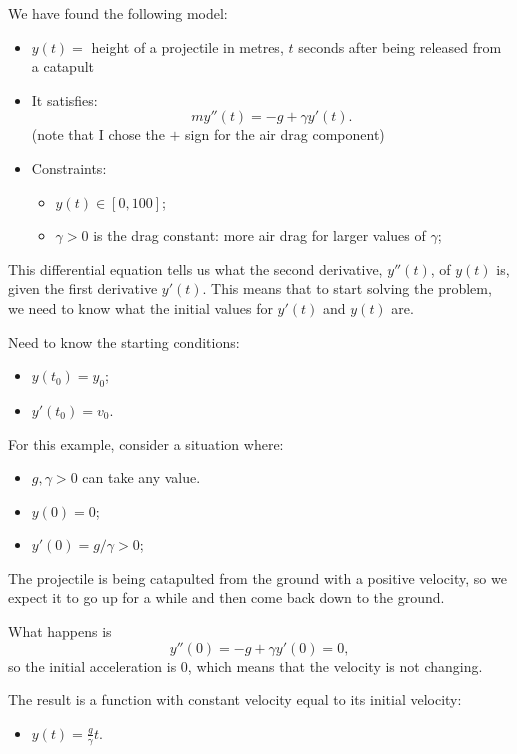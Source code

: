 \begin{example}
We have found the following model:
\begin{itemize}
	\item $y(t) = $ height of a projectile in metres, $t$ seconds after being released from a catapult
	\item It satisfies:
		$$m y''(t) =  -g + \gamma y'(t).$$
	\hfill (note that I chose the $+$ sign for the air drag component)

	\item Constraints:
	\begin{itemize}
		\item $y(t) \in [0,100]$;
		\item $\gamma >0$ is the drag constant: more air drag for larger values of $\gamma$;\\
	\end{itemize}
\end{itemize}	

This differential equation tells us what the second derivative, $y''(t)$, of $y(t)$ is, given the first derivative $y'(t)$.
This means that to start solving the problem, we need to know what the initial values for $y'(t)$ and $y(t)$ are.

Need to know the starting conditions:
\begin{itemize}
	\item $y(t_0) = y_0$;
	\item $y'(t_0) = v_0$.
\end{itemize}

For this example, consider a situation where:
\begin{itemize}
	\item $g, \gamma >0$ can take any value.
	\item $y(0) = 0$;
	\item $y'(0) = g/\gamma > 0$;
\end{itemize}

The projectile is being catapulted from the ground with a positive velocity, so we expect it to go up for a while and then come back down to the ground.

What happens is 
$$
y''(0) = -g + \gamma y'(0) = 0,
$$
so the initial acceleration is 0, which means that the velocity is not changing.

The result is a function with constant velocity equal to its initial velocity:
\begin{itemize}
	\item $y(t) = \frac{g}{\gamma}t.$
\end{itemize}


\end{example}
